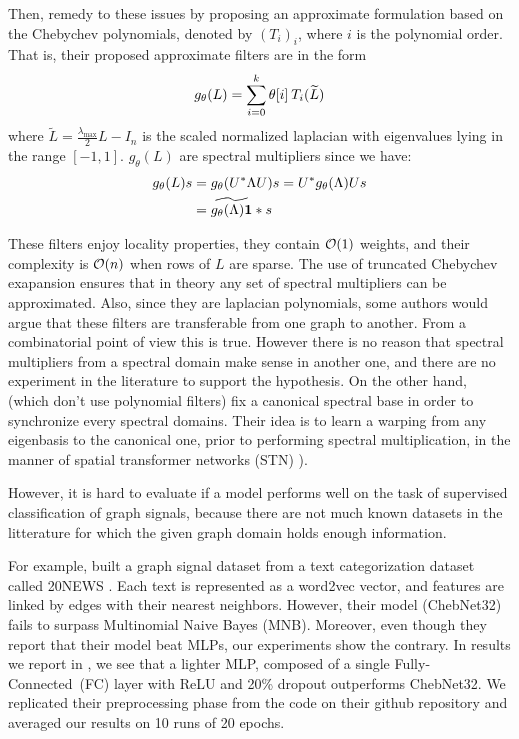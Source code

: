 Then, \cite{defferrard2016convolutional} remedy to these issues by proposing an approximate formulation based on the Chebychev polynomials, denoted by $(T_i)_i$, where $i$ is the polynomial order.
That is, their proposed approximate filters are in the form
\begin{gather}
g_\theta(L) = \sum_{i=0}^k \theta[i] \h{2} T_i(\widetilde{L})
\end{gather}
where $\widetilde{L} = \frac{\lambda_{\max}}2L - I_n$ is the scaled normalized laplacian with eigenvalues lying in the range $[-1,1]$. $g_\theta(L)$ are spectral multipliers since we have:
\begin{align}
g_\theta(L)s &= g_\theta(U^*\Lambda U)s
= U^* g_\theta(\Lambda) Us\nonumber\\
&= \widetilde{g_\theta(\Lambda) \textbf1} \ast s
\end{align}

These filters enjoy locality properties, they contain $\co(1)$ weights, and their complexity is $\co(n)$ when rows of $L$ are sparse. The use of truncated Chebychev exapansion \citep{hammond2011wavelets} ensures that in theory any set of spectral multipliers can be approximated. Also, since they are laplacian polynomials, some authors would argue that these filters are transferable from one graph to another. From a combinatorial point of view this is true. However there is no reason that spectral multipliers from a spectral domain make sense in another one, and there are no experiment in the literature to support the hypothesis. On the other hand, \citep{yi2016syncspeccnn} (which don't use polynomial filters) fix a canonical spectral base in order to synchronize every spectral domains. Their idea is to learn a warping from any eigenbasis to the canonical one, prior to performing spectral multiplication, in the manner of spatial transformer networks (STN) \cite{jaderberg2015spatial}).

However, it is hard to evaluate if a model performs well on the task of supervised classification of graph signals, because there are not much known datasets in the litterature for which the given graph domain holds enough information.

For example, \citeauthor{defferrard2016convolutional} built a graph signal dataset from a text categorization dataset called 20NEWS \citep{joachims1996probabilistic}. Each text is represented as a word2vec vector, and features are linked by edges with their nearest neighbors. However, their model (ChebNet32) fails to surpass Multinomial Naive Bayes (MNB). Moreover, even though they report that their model beat MLPs, our experiments show the contrary. In results we report in , we see that a lighter MLP, composed of a single Fully-Connected~(FC) layer with ReLU and 20\% dropout outperforms ChebNet32. We replicated their preprocessing phase from the code on their github repository and averaged our results on 10 runs of 20 epochs.


